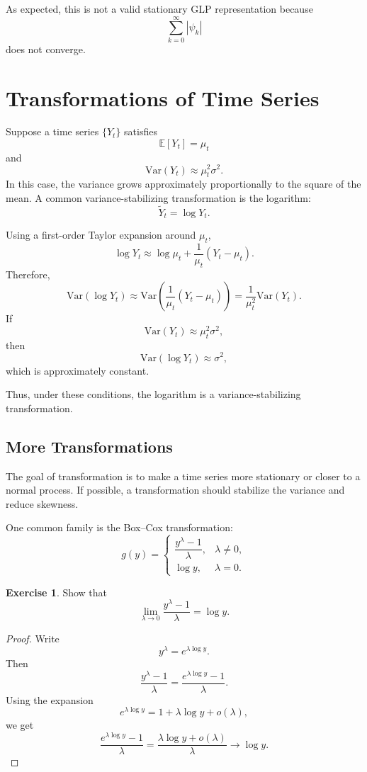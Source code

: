 \documentclass[12pt,oneside]{book}
\numberwithin{equation}{section}
\theoremstyle{definition}
\newtheorem{exercise}{Exercise}[section]
\theoremstyle{plain}
\theoremstyle{remark}
\newcommand{\E}{\mathbb{E}}
\newcommand{\Var}{\mathrm{Var}}
\begin{document}
As expected, this is not a valid stationary GLP representation because
\[
\sum_{k=0}^{\infty}|\psi_k|
\]
does not converge.

\section{Transformations of Time Series}

Suppose a time series $\{Y_t\}$ satisfies
\[
\E[Y_t]=\mu_t
\]
and
\[
\Var(Y_t)\approx \mu_t^2\sigma^2.
\]
In this case, the variance grows approximately proportionally to the square of the mean. A common variance-stabilizing transformation is the logarithm:
\[
\widetilde{Y}_t=\log Y_t.
\]

Using a first-order Taylor expansion around $\mu_t$,
\[
\log Y_t
\approx
\log \mu_t+\frac{1}{\mu_t}(Y_t-\mu_t).
\]
Therefore,
\[
\Var(\log Y_t)
\approx
\Var\left(\frac{1}{\mu_t}(Y_t-\mu_t)\right)
=
\frac{1}{\mu_t^2}\Var(Y_t).
\]
If
\[
\Var(Y_t)\approx \mu_t^2\sigma^2,
\]
then
\[
\Var(\log Y_t)\approx \sigma^2,
\]
which is approximately constant.

Thus, under these conditions, the logarithm is a variance-stabilizing transformation.

\subsection*{More Transformations}

The goal of transformation is to make a time series more stationary or closer to a normal process. If possible, a transformation should stabilize the variance and reduce skewness.

One common family is the Box--Cox transformation:
\[
g(y)
=
\begin{cases}
\dfrac{y^\lambda-1}{\lambda}, & \lambda\neq 0,\\
\log y, & \lambda=0.
\end{cases}
\]

\begin{exercise}
Show that
\[
\lim_{\lambda\to 0}\frac{y^\lambda-1}{\lambda}
=
\log y.
\]
\end{exercise}

\begin{proof}
Write
\[
y^\lambda=e^{\lambda\log y}.
\]
Then
\[
\frac{y^\lambda-1}{\lambda}
=
\frac{e^{\lambda\log y}-1}{\lambda}.
\]
Using the expansion
\[
e^{\lambda\log y}
=
1+\lambda\log y+o(\lambda),
\]
we get
\[
\frac{e^{\lambda\log y}-1}{\lambda}
=
\frac{\lambda\log y+o(\lambda)}{\lambda}
\to
\log y.
\]
\end{proof}
\end{document}

